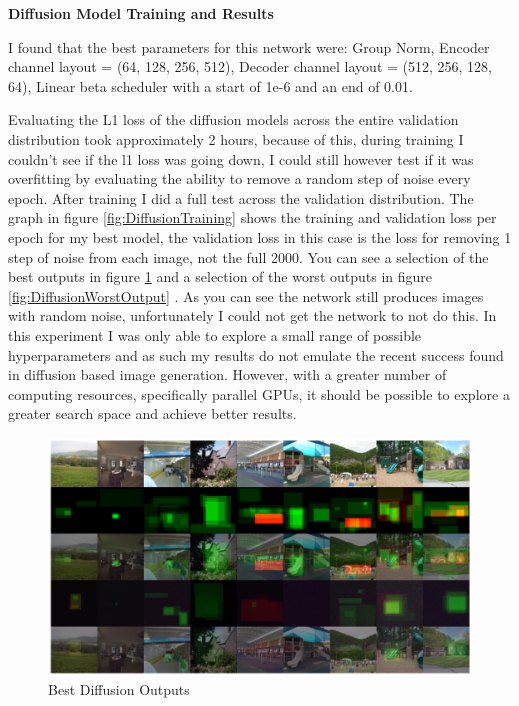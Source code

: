 \documentclass{UoYCSproject}
\begin{document}
\textbf{Diffusion Model Training and Results}

I found that the best parameters for this network were: Group Norm, Encoder channel layout = (64, 128, 256, 512), Decoder channel layout = (512, 256, 128, 64), Linear beta scheduler with a start of 1e-6 and an end of 0.01.

Evaluating the L1 loss of the diffusion models across the entire validation distribution took approximately 2 hours, because of this, during training I couldn't see if the l1 loss was going down, I could still however test if it was overfitting by evaluating the ability to remove a random step of noise every epoch. After training I did a full test across the validation distribution. The graph in figure 
\ref{fig:DiffusionTraining}
shows the training and validation loss per epoch for my best model, the validation loss in this case is the loss for removing 1 step of noise from each image, not the full 2000. 
You can see a selection of the best outputs in figure 
\ref{fig:DiffusionBestOutputs}
and a selection of the worst outputs in figure 
\ref{fig:DiffusionWorstOutput}
. As you can see the network still produces images with random noise, unfortunately I could not get the network to not do this. In this experiment I was only able to explore a small range of possible hyperparameters and as such my results do not emulate the recent success found in diffusion based image generation. \cite{ramesh2022hierarchical, saharia2022photorealistic} However, with a greater number of computing resources, specifically parallel GPUs, it should be possible to explore a greater search space and achieve better results.

\begin{figure}[ht]
    \centering
    \includegraphics[width=\linewidth]{Diffusion Best Outputs}
    \caption{Best Diffusion Outputs}
    \label{fig:DiffusionBestOutputs}
\end{figure}
\end{document}
